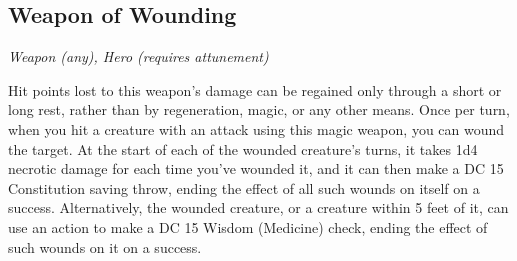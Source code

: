 \subsection{Weapon of Wounding}
\textit{Weapon (any), Hero (requires attunement)}

Hit points lost to this weapon's damage can be regained only through a short or long rest, rather than by regeneration, magic, or any other means.
Once per turn, when you hit a creature with an attack using this magic weapon, you can wound the target. At the start of each of the wounded creature's turns, it takes 1d4 necrotic damage for each time you've wounded it, and it can then make a DC 15 Constitution saving throw, ending the effect of all such wounds on itself on a success. Alternatively, the wounded creature, or a creature within 5 feet of it, can use an action to make a DC 15 Wisdom (Medicine) check, ending the effect of such wounds on it on a success.